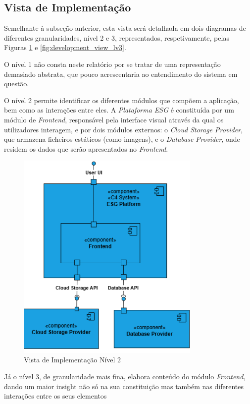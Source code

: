 \subsection{Vista de Implementação}

Semelhante à subseção anterior, esta vista será detalhada em dois diagramas de diferentes granularidades, nível 2 e 3, representados, respetivamente, pelas Figuras \ref{fig:development_view_lv2} e \ref{fig:development_view_lv3}.

O nível 1 não consta neste relatório por se tratar de uma representação demasiado abstrata, que pouco acrescentaria ao entendimento do sistema em questão.

O nível 2 permite identificar os diferentes módulos que compõem a aplicação, bem como as interações entre eles. A \textit{Plataforma ESG} é constituída por um módulo de \textit{Frontend}, responsável pela interface visual através da qual os utilizadores interagem, e por dois módulos externos: o \textit{Cloud Storage Provider}, que armazena ficheiros estáticos (como imagens), e o \textit{Database Provider}, onde residem os dados que serão apresentados no \textit{Frontend}.

\begin{figure}[H]
    \centering
    \includegraphics[width=3.5in,keepaspectratio]{frontmatter/assets/diagrams/Development View/Implementation View Lv2.drawio.png}
    \caption{Vista de Implementação Nível 2}
    \label{fig:development_view_lv2}
\end{figure}

Já o nível 3, de granularidade mais fina, elabora conteúdo do módulo \textit{Frontend}, dando um maior insight não só na sua constituição mas também nas diferentes interações entre os seus elementos 

